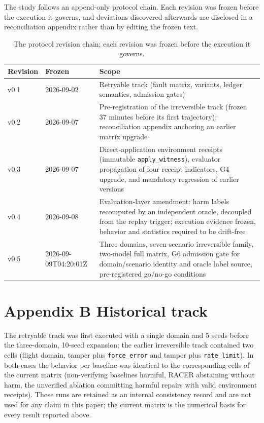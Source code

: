 \documentclass[10pt]{article}
\begin{document}
The study follows an append-only protocol chain. Each revision was frozen before the execution it governs, and deviations discovered afterwards are disclosed in a reconciliation appendix rather than by editing the frozen text.

\begin{table}[t]
\centering
\caption{The protocol revision chain; each revision was frozen before the execution it governs.}
\label{tab:2}
\begin{tabular}{lll}
\toprule
Revision & Frozen & Scope \\
\midrule
v0.1 & 2026-09-02 & Retryable track (fault matrix, variants, ledger semantics, admission gates) \\
v0.2 & 2026-09-07 & Pre-registration of the irreversible track (frozen 37 minutes before its first trajectory); reconciliation appendix anchoring an earlier matrix upgrade \\
v0.3 & 2026-09-07 & Direct-application environment receipts (immutable \texttt{apply\_witness}), evaluator propagation of four receipt indicators, G4 upgrade, and mandatory regression of earlier versions \\
v0.4 & 2026-09-08 & Evaluation-layer amendment: harm labels recomputed by an independent oracle, decoupled from the replay trigger; execution evidence frozen, behavior and statistics required to be drift-free \\
v0.5 & 2026-09-09T04:20:01Z & Three domains, seven-scenario irreversible family, two-model full matrix, G6 admission gate for domain/scenario identity and oracle label source, pre-registered go/no-go conditions \\
\bottomrule
\end{tabular}
\end{table}


\section*{Appendix B Historical track}

The retryable track was first executed with a single domain and 5 seeds before the three-domain, 10-seed expansion; the earlier irreversible track contained two cells (flight domain, tamper plus \texttt{force\_error} and tamper plus \texttt{rate\_limit}). In both cases the behavior per baseline was identical to the corresponding cells of the current matrix (non-verifying baselines harmful, RACER abstaining without harm, the unverified ablation committing harmful repairs with valid environment receipts). Those runs are retained as an internal consistency record and are not used for any claim in this paper; the current matrix is the numerical basis for every result reported above.
\end{document}
